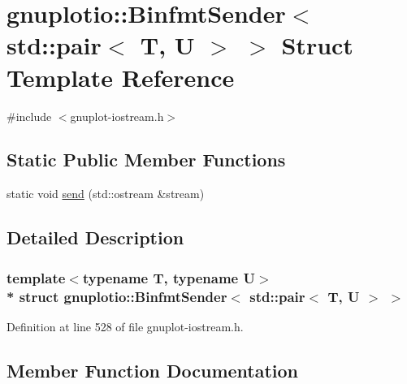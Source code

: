 \hypertarget{structgnuplotio_1_1_binfmt_sender_3_01std_1_1pair_3_01_t_00_01_u_01_4_01_4}{}\section{gnuplotio\+:\+:Binfmt\+Sender$<$ std\+:\+:pair$<$ T, U $>$ $>$ Struct Template Reference}
\label{structgnuplotio_1_1_binfmt_sender_3_01std_1_1pair_3_01_t_00_01_u_01_4_01_4}


{\ttfamily \#include $<$gnuplot-\/iostream.\+h$>$}

\subsection*{Static Public Member Functions}
\begin{DoxyCompactItemize}
\item 
static void \hyperlink{structgnuplotio_1_1_binfmt_sender_3_01std_1_1pair_3_01_t_00_01_u_01_4_01_4_a08b2bedbc54824cd202c664116e37243}{send} (std\+::ostream \&stream)
\end{DoxyCompactItemize}


\subsection{Detailed Description}
\subsubsection*{template$<$typename T, typename U$>$\\*
struct gnuplotio\+::\+Binfmt\+Sender$<$ std\+::pair$<$ T, U $>$ $>$}



Definition at line 528 of file gnuplot-\/iostream.\+h.



\subsection{Member Function Documentation}
